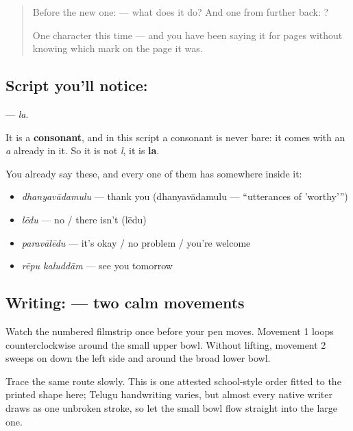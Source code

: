 \label{lesson:TE-S114-letter-la}



\begin{quote}
Before the new one:  — what does it do? And one from further back: ?

One character this time — and you have been saying it for pages without knowing which mark on the page it was.
\end{quote}

\subsection*{Script you'll notice: }
\textbf{} — \emph{la}.

It is a \textbf{consonant}, and in this script a consonant is never bare: it comes with an \emph{a} already in it. So it is not \emph{l}, it is \textbf{la}.

You already say these, and every one of them has  somewhere inside it:

\begin{itemize}
\raggedright
  \item \textbf{} \emph{dhanyavādamulu} — thank you (dhanyavādamulu — \textquotedblleft{}utterances of 'worthy'\textquotedblright{})
  \item \textbf{} \emph{lēdu} — no / there isn't (lēdu)
  \item \textbf{} \emph{paravālēdu} — it's okay / no problem / you're welcome
  \item \textbf{ } \emph{rēpu kaluddām} — see you tomorrow
\end{itemize}

\subsection*{Writing:  — two calm movements}

Watch the numbered filmstrip once before your pen moves. Movement 1 loops counterclockwise around the small upper bowl. Without lifting, movement 2 sweeps on down the left side and around the broad lower bowl.

Trace the same route slowly. This is one attested school-style order fitted to the printed shape here; Telugu handwriting varies, but almost every native writer draws  as one unbroken stroke, so let the small bowl flow straight into the large one.

